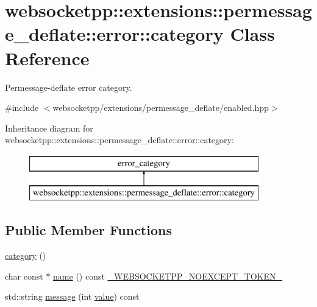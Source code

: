 \hypertarget{classwebsocketpp_1_1extensions_1_1permessage__deflate_1_1error_1_1category}{}\section{websocketpp\+:\+:extensions\+:\+:permessage\+\_\+deflate\+:\+:error\+:\+:category Class Reference}
\label{classwebsocketpp_1_1extensions_1_1permessage__deflate_1_1error_1_1category}


Permessage-\/deflate error category.  




{\ttfamily \#include $<$websocketpp/extensions/permessage\+\_\+deflate/enabled.\+hpp$>$}

Inheritance diagram for websocketpp\+:\+:extensions\+:\+:permessage\+\_\+deflate\+:\+:error\+:\+:category\+:\begin{figure}[H]
\begin{center}
\leavevmode
\includegraphics[height=2.000000cm]{classwebsocketpp_1_1extensions_1_1permessage__deflate_1_1error_1_1category}
\end{center}
\end{figure}
\subsection*{Public Member Functions}
\begin{DoxyCompactItemize}
\item 
\hyperlink{classwebsocketpp_1_1extensions_1_1permessage__deflate_1_1error_1_1category_a9c0026b8e71ac960bbe48f58df71dac7}{category} ()
\item 
char const $\ast$ \hyperlink{classwebsocketpp_1_1extensions_1_1permessage__deflate_1_1error_1_1category_a042aa64aca0a9118cda65c25e8fbb83b}{name} () const \hyperlink{boost__config_8hpp_aa19747404a5f2fe9c9eb9e9d2e48f26c}{\+\_\+\+W\+E\+B\+S\+O\+C\+K\+E\+T\+P\+P\+\_\+\+N\+O\+E\+X\+C\+E\+P\+T\+\_\+\+T\+O\+K\+E\+N\+\_\+}
\item 
std\+::string \hyperlink{classwebsocketpp_1_1extensions_1_1permessage__deflate_1_1error_1_1category_a4649c76d17bebf65af4a817e768a61fd}{message} (int \hyperlink{namespacewebsocketpp_1_1extensions_1_1permessage__deflate_1_1error_a38e53d7586dd60059cc99a5833bbe54e}{value}) const 
\end{DoxyCompactItemize}


